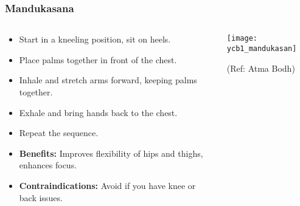 \begin{frame}[fragile]\frametitle{Mandukasana}
\begin{columns}
    \begin{column}[T]{0.5\linewidth}
      \begin{itemize}
        \item Start in a kneeling position, sit on heels.
        \item Place palms together in front of the chest.
        \item Inhale and stretch arms forward, keeping palms together.
        \item Exhale and bring hands back to the chest.
        \item Repeat the sequence.
        \item \textbf{Benefits:} Improves flexibility of hips and thighs, enhances focus.
        \item \textbf{Contraindications:} Avoid if you have knee or back issues.
      \end{itemize}
    \end{column}
    \begin{column}[T]{0.5\linewidth}
        \begin{center}
        \begin{center}
		        \texttt{[image: ycb1\_mandukasan]}
				
				{\tiny (Ref: Atma Bodh)}	        
		\end{center}   
        \end{center}    
    \end{column}
  \end{columns}
\end{frame}

